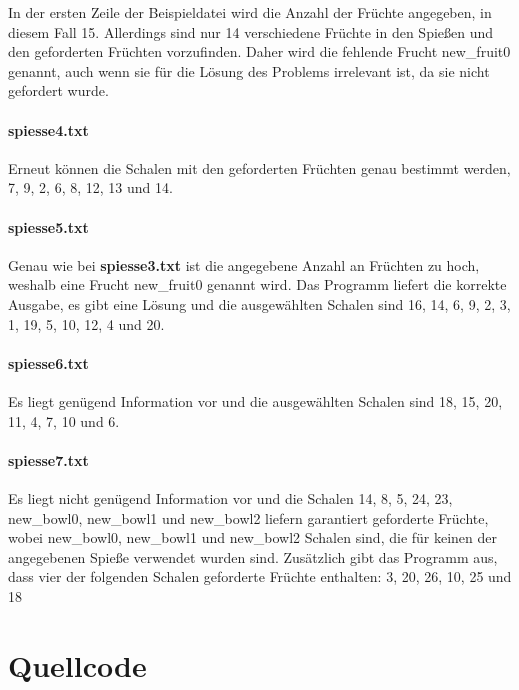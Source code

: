 \documentclass[a4paper,10pt,ngerman]{scrartcl}
\begin{document}
In der ersten Zeile der Beispieldatei wird die Anzahl der Früchte angegeben, in diesem Fall 15.
Allerdings sind nur 14 verschiedene Früchte in den Spießen und den geforderten Früchten vorzufinden.
Daher wird die fehlende Frucht new\_fruit0 genannt, auch wenn sie für die Lösung des Problems irrelevant ist, da sie nicht gefordert wurde.

\paragraph{spiesse4.txt}
Erneut können die Schalen mit den geforderten Früchten genau bestimmt werden, 7, 9, 2, 6, 8, 12, 13 und 14.

\paragraph{spiesse5.txt}
Genau wie bei \textbf{spiesse3.txt} ist die angegebene Anzahl an Früchten zu hoch, weshalb eine Frucht new\_fruit0 genannt wird.
Das Programm liefert die korrekte Ausgabe, es gibt eine Lösung und die ausgewählten Schalen sind 16, 14, 6, 9, 2, 3, 1, 19, 5, 10, 12, 4 und 20.

\paragraph{spiesse6.txt}
Es liegt genügend Information vor und die ausgewählten Schalen sind 18, 15, 20, 11, 4, 7, 10 und 6.

\paragraph{spiesse7.txt}
Es liegt nicht genügend Information vor und die Schalen 14, 8, 5, 24, 23, new\_bowl0, new\_bowl1 und new\_bowl2 liefern garantiert geforderte Früchte, wobei new\_bowl0, new\_bowl1 und new\_bowl2 Schalen sind, die für keinen der angegebenen Spieße verwendet wurden sind.
Zusätzlich gibt das Programm aus, dass vier der folgenden Schalen geforderte Früchte enthalten: 3, 20, 26, 10, 25 und 18

\section{Quellcode}
\end{document}
